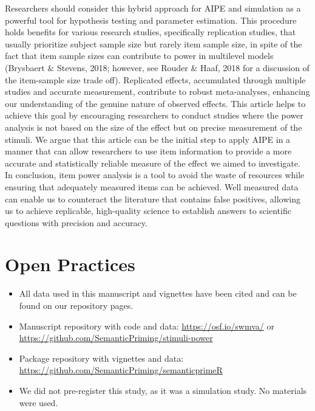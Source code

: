 \documentclass[
  man]{apa7}
\providecommand{\tightlist}{%
  \setlength{\itemsep}{0pt}\setlength{\parskip}{0pt}}
\begin{document}
Researchers should consider this hybrid approach for AIPE and simulation as a powerful tool for hypothesis testing and parameter estimation. This procedure holds benefits for various research studies, specifically replication studies, that usually prioritize subject sample size but rarely item sample size, in spite of the fact that item sample sizes can contribute to power in multilevel models (Brysbaert \& Stevens, 2018; however, see Rouder \& Haaf, 2018 for a discussion of the item-sample size trade off). Replicated effects, accumulated through multiple studies and accurate measurement, contribute to robust meta-analyses, enhancing our understanding of the genuine nature of observed effects. This article helps to achieve this goal by encouraging researchers to conduct studies where the power analysis is not based on the size of the effect but on precise measurement of the stimuli. We argue that this article can be the initial step to apply AIPE in a manner that can allow researchers to use item information to provide a more accurate and statistically reliable measure of the effect we aimed to investigate. In conclusion, item power analysis is a tool to avoid the waste of resources while ensuring that adequately measured items can be achieved. Well measured data can enable us to counteract the literature that contains false positives, allowing us to achieve replicable, high-quality science to establish answers to scientific questions with precision and accuracy.

\section{Open Practices}\label{open-practices}

\begin{itemize}
\tightlist
\item
  All data used in this manuscript and vignettes have been cited and can be found on our repository pages.
\item
  Manuscript repository with code and data: \url{https://osf.io/swmva/} or \url{https://github.com/SemanticPriming/stimuli-power}
\item
  Package repository with vignettes and data: \url{https://github.com/SemanticPriming/semanticprimeR}
\item
  We did not pre-register this study, as it was a simulation study. No materials were used.
\end{itemize}

\newpage
\end{document}
